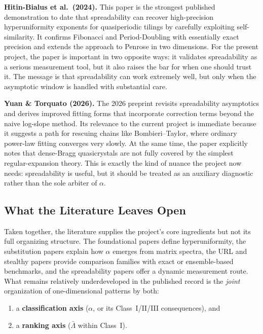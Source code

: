 \documentclass[11pt,letterpaper]{article}
\begin{document}
\vspace{0.4em}
\noindent\textbf{Hitin-Bialus et al.\ (2024).}
This paper is the strongest published demonstration to date that spreadability can recover
high-precision hyperuniformity exponents for quasiperiodic tilings by carefully exploiting
self-similarity.
It confirms Fibonacci and Period-Doubling with essentially exact precision and extends the
approach to Penrose in two dimensions.
For the present project, the paper is important in two opposite ways:
it validates spreadability as a serious measurement tool, but it also raises the bar for
when one should trust it.
The message is that spreadability can work extremely well, but only when the asymptotic
window is handled with substantial care.

\vspace{0.4em}
\noindent\textbf{Yuan \& Torquato (2026).}
The 2026 preprint revisits spreadability asymptotics and derives improved fitting forms
that incorporate correction terms beyond the naive log-slope method.
Its relevance to the current project is immediate because it suggests a path for rescuing
chains like Bombieri--Taylor, where ordinary power-law fitting converges very slowly.
At the same time, the paper explicitly notes that dense-Bragg quasicrystals are not fully
covered by the simplest regular-expansion theory.
This is exactly the kind of nuance the project now needs: spreadability is useful, but it
should be treated as an auxiliary diagnostic rather than the sole arbiter of $\alpha$.

\subsection{What the Literature Leaves Open}

\noindent Taken together, the literature supplies the project's core ingredients but not its
full organizing structure.
The foundational papers define hyperuniformity, the substitution papers explain how
$\alpha$ emerges from matrix spectra, the URL and stealthy papers provide comparison
families with exact or ensemble-based benchmarks, and the spreadability papers offer a
dynamic measurement route.
What remains relatively underdeveloped in the published record is the \emph{joint}
organization of one-dimensional patterns by both:
\begin{enumerate}[noitemsep]
  \item a \textbf{classification axis} ($\alpha$, or its Class~I/II/III consequences), and
  \item a \textbf{ranking axis} ($\bar\Lambda$ within Class~I).
\end{enumerate}
\end{document}
